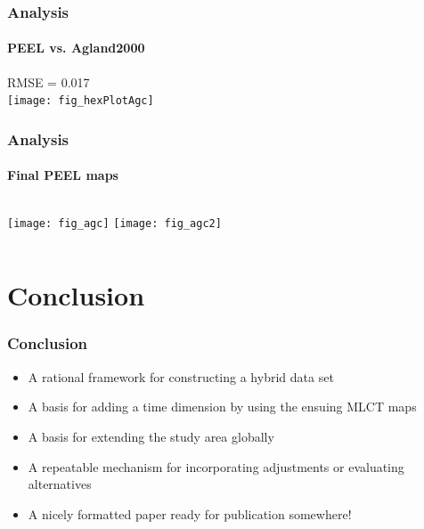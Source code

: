 \documentclass{beamer}
\begin{document}
\begin{frame}
  \frametitle{Analysis}
  \framesubtitle{PEEL vs. Agland2000}
  \begin{center}
    RMSE = 0.017 \\
    \texttt{[image: fig\_hexPlotAgc]}    
  \end{center}
\end{frame}

\begin{frame}
  \frametitle{Analysis}
  \framesubtitle{Final PEEL maps}
  \begin{columns}[t]
    \column{2.5in}
    \centering
    \texttt{[image: fig\_agc]}
    \column{2.5in}
    \texttt{[image: fig\_agc2]}    
  \end{columns}
\end{frame}

\section{Conclusion}
\label{sec:conclusion}


\begin{frame}
  \frametitle{Conclusion}
  \begin{itemize}
  \item A rational framework for constructing a hybrid data set
  \pause
  \item A basis for adding a time dimension by using the ensuing MLCT maps
  \pause
  \item A basis for extending the study area globally
  \pause
  \item A repeatable mechanism for incorporating adjustments or evaluating alternatives
  \pause
  \item A nicely formatted paper ready for publication somewhere!
  \end{itemize}
\end{frame}
\end{document}

